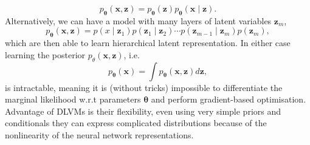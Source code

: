 \documentclass[final,3p,times,twocolumn]{elsarticle}
\begin{document}
\begin{equation}
	p_{\boldsymbol{\theta}}(\mathbf{x}, \mathbf{z})=p_{\boldsymbol{\theta}}(\mathbf{z}) p_{\boldsymbol{\theta}}(\mathbf{x} \mid \mathbf{z}).
\end{equation}
Alternatively, we can have a model with many layers of latent variables $\mathbf{z}_m$,
\begin{equation}
	p_{\boldsymbol{\theta}}(\mathbf{x}, \mathbf{\mathbf{z}}) = p\left(x \mid \mathbf{z}_{1}\right) p\left(\mathbf{z}_{1} \mid \mathbf{z}_{2}\right) \cdots p\left(\mathbf{z}_{m-1} \mid \mathbf{z}_{m}\right) p\left(\mathbf{z}_{m}\right),
\end{equation} 
which are then able to learn hierarchical latent representation. In either case learning the posterior $p_{\theta}(\mathbf{x}, \mathbf{z})$, i.e.
\begin{equation}
	p_{\boldsymbol{\theta}}(\mathbf{x})=\int p_{\boldsymbol{\theta}}(\mathbf{x}, \mathbf{z}) d \mathbf{z},
\end{equation}
is intractable, meaning it is (without tricks) impossible to differentiate the marginal likelihood w.r.t parameters $\boldsymbol{\theta}$ and perform gradient-based optimisation. Advantage of DLVMs is their flexibility, even using very simple priors and conditionals they can express complicated distributions because of the nonlinearity of the neural network representations. 
\end{document}
